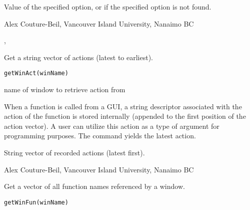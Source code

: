 \documentclass[letterpaper]{book}
\begin{document}
%
\begin{Value}
Value of the specified option, or  if the specified option is not found.
\end{Value}
%
\begin{Author}\relax
Alex Couture-Beil, Vancouver Island University, Nanaimo BC
\end{Author}
%
\begin{SeeAlso}\relax
 ,  
\end{SeeAlso}
%
\begin{Description}\relax
Get a string vector of actions (latest to earliest).
\end{Description}
%
\begin{Usage}
\begin{verbatim}
getWinAct(winName)
\end{verbatim}
\end{Usage}
%
\begin{Arguments}
\begin{ldescription}
\item[\code{winName}] name of window to retrieve action from
\end{ldescription}
\end{Arguments}
%
\begin{Details}\relax
 
When a function is called from a GUI, a string descriptor associated with 
the action of the function is stored internally (appended to the first position 
of the action vector). A user can utilize this action as a type of argument 
for programming purposes. The command  yields the latest action.
\end{Details}
%
\begin{Value}
String vector of recorded actions (latest first).
\end{Value}
%
\begin{Author}\relax
Alex Couture-Beil, Vancouver Island University, Nanaimo BC
\end{Author}
%
\begin{Description}\relax
Get a vector of all function names referenced by a window.
\end{Description}
%
\begin{Usage}
\begin{verbatim}
getWinFun(winName)
\end{verbatim}
\end{Usage}
\end{document}
